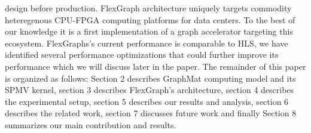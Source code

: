 design before production. FlexGraph architecture uniquely targets commodity heteregenous CPU-FPGA computing platforms \cite{Intel-FPGA} for data centers. To the best of our knowledge it is a first implementation of a graph accelerator targeting this ecosystem. FlexGraphs's current performance is comparable to HLS, we have identified several performance optimizations that could further improve its performance which we will discuss later in the paper.
The remainder of this paper is organized as follows:
Section 2 describes GraphMat computing model and its SPMV kernel, section 3 describes FlexGraph's architecture, section 4 describes the experimental setup, section 5 describes our results and analysis, section 6 describes the related work, section 7 discusses future work and finally Section 8 summarizes our main contribution and results.